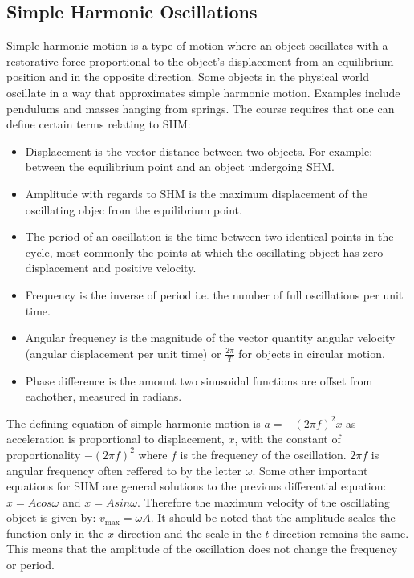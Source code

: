 \documentclass[a4,8pt]{article}
\begin{document}
\subsection{Simple Harmonic Oscillations}
Simple harmonic motion is a type of motion where an object oscillates with a restorative 
force proportional to the object's displacement from an equilibrium position and in the 
opposite direction. Some objects in the physical world oscillate in a way that approximates 
simple harmonic motion. Examples include pendulums and masses hanging from springs. The 
course requires that one can define certain terms relating to SHM:
\begin{itemize}
	\item Displacement is the vector distance between two objects. For example: between the 
    equilibrium point and an object undergoing SHM.
	\item Amplitude with regards to SHM is the maximum displacement of the oscillating objec 
    from the equilibrium point.
	\item The period of an oscillation is the time between two identical points in the cycle,
    most commonly the points at which the oscillating object has zero displacement and 
    positive velocity.
	\item Frequency is the inverse of period i.e. the number of full oscillations per unit
    time.
	\item Angular frequency is the magnitude of the vector quantity angular velocity (angular
    displacement per unit time) or $\frac{2\pi}{T}$ for objects in circular motion.
	\item Phase difference is the amount two sinusoidal functions are offset from eachother, 
    measured in radians.
\end{itemize}

The defining equation of simple harmonic motion is $a=-(2\pi f)^2 x$ as acceleration is 
proportional to displacement, $x$, with the constant of proportionality $-(2\pi f)^2$ where 
$f$ is the frequency of the oscillation. $2\pi f$ is angular frequency often reffered to by 
the letter $\omega$. Some other important equations for SHM are general solutions to the 
previous differential equation: $x=Acos\omega$ and $x=Asin\omega$. Therefore the maximum 
velocity of the oscillating object is given by: $v_\text{max}=\omega A$. It should be noted 
that the amplitude scales the function only in the $x$ direction and the scale in the $t$ 
direction remains the same. This means that the amplitude of the oscillation does not change 
the frequency or period.
\vspace{8pt}
\end{document}
